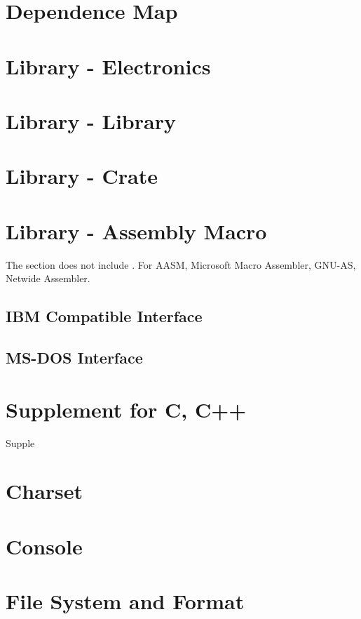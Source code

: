 \section{Dependence Map}

\section{Library \mbox{-} Electronics}

\section{Library \mbox{-}  Library}

\section{Library \mbox{-}  Crate}

\section{Library \mbox{-} Assembly Macro}

The section does not include . For AASM, Microsoft Macro Assembler, GNU-AS, Netwide Assembler.

\subsection{IBM Compatible Interface}

\subsection{MS-DOS Interface}

\section{Supplement for C, C++}
{Supple}

\section{Charset}


\section{Console}


\section{File System and Format}


